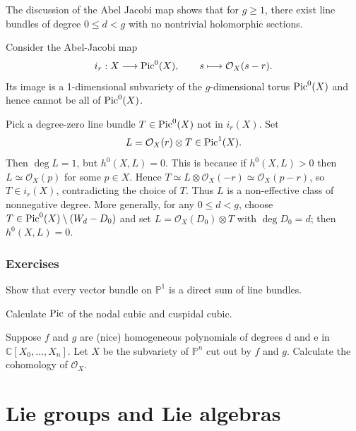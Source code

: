 \documentclass[12pt]{article}
\begin{document}
\begin{remark}\label{rmk:non-effective}

    The discussion of the Abel Jacobi map shows that for $g \geq 1$, there exist line bundles of degree $0 \leq d < g$ with no nontrivial holomorphic sections.

    Consider the Abel-Jacobi map
    \[
        i_r:X\longrightarrow \operatorname{Pic}^0(X),\qquad s\longmapsto \mathcal{O}_X(s-r).
    \]
    Its image is a 1-dimensional subvariety of the $g$-dimensional torus $\operatorname{Pic}^0(X)$ and hence cannot be all of $\operatorname{Pic}^0(X)$.

    Pick a degree-zero line bundle $T\in\operatorname{Pic}^0(X)$ not in $i_r(X)$.
    Set
    \[
        L = \mathcal{O}_X(r)\otimes T \in \operatorname{Pic}^1(X).
    \]
    Then $\deg L=1$, but $h^0(X,L)=0$. This is because if $h^0(X,L)>0$ then $L\simeq \mathcal{O}_X(p)$ for some $p\in X$. Hence
    $T \simeq L\otimes \mathcal{O}_X(-r) \simeq \mathcal{O}_X(p-r)$,
    so $T\in i_r(X)$, contradicting the choice of $T$. Thus $L$ is a non-effective class of nonnegative degree.
    More generally, for any $0\le d<g$, choose $T\in\operatorname{Pic}^0(X)\setminus (W_d - D_0)$ and set $L=\mathcal{O}_X(D_0)\otimes T$ with $\deg D_0=d$; then $h^0(X,L)=0$.
\end{remark}

\subsubsection{Exercises}
\begin{exercise}
    Show that every vector bundle on $\mathbb{P}^1$ is a direct sum of line bundles.
\end{exercise}

\begin{exercise}
    Calculate $\operatorname{Pic}$ of the nodal cubic and cuspidal cubic.
\end{exercise}

\begin{exercise}
Suppose $f$ and $g$ are (nice) homogeneous polynomials of degrees d and e in $\mathbb{C}[X_0, \ldots, X_n]$.  Let $X$ be the subvariety of $\mathbb{P}^n$ cut out by $f$ and $g$.  Calculate the cohomology of $\mathcal{O}_X$.
\end{exercise}

\section{Lie groups and Lie algebras}
\end{document}
